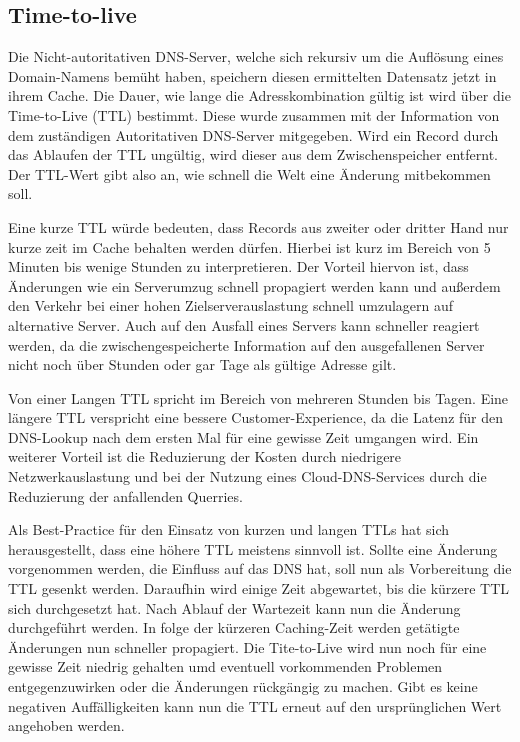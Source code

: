 \subsection{Time-to-live} \label{lab:ttl}
Die Nicht-autoritativen DNS-Server, welche sich rekursiv um die Auflösung eines Domain-Namens bemüht haben, speichern diesen ermittelten Datensatz jetzt in ihrem Cache. Die Dauer, wie lange die Adresskombination gültig ist wird über die Time-to-Live (TTL) bestimmt. Diese wurde zusammen mit der Information von dem zuständigen Autoritativen DNS-Server mitgegeben. Wird ein Record durch das Ablaufen der TTL ungültig, wird dieser aus dem Zwischenspeicher entfernt. Der TTL-Wert gibt also an, wie schnell die Welt eine Änderung mitbekommen soll. 

Eine kurze TTL würde bedeuten, dass Records aus zweiter oder dritter Hand nur kurze zeit im Cache behalten werden dürfen. Hierbei ist kurz im Bereich von 5 Minuten bis wenige Stunden zu interpretieren. Der Vorteil hiervon ist, dass Änderungen wie ein Serverumzug schnell propagiert werden kann und außerdem den Verkehr bei einer hohen Zielserverauslastung schnell umzulagern auf alternative Server. Auch auf den Ausfall eines Servers kann schneller reagiert werden, da die zwischengespeicherte Information auf den ausgefallenen Server nicht noch über Stunden oder gar Tage als gültige Adresse gilt.

Von einer Langen TTL spricht im Bereich von mehreren Stunden bis Tagen. Eine längere TTL verspricht eine bessere Customer-Experience, da die Latenz für den DNS-Lookup nach dem ersten Mal für eine gewisse Zeit umgangen wird. Ein weiterer Vorteil ist die Reduzierung der Kosten durch niedrigere Netzwerkauslastung und bei der Nutzung eines Cloud-DNS-Services durch die Reduzierung der anfallenden Querries.

Als Best-Practice für den Einsatz von kurzen und langen TTLs hat sich herausgestellt, dass eine höhere TTL meistens sinnvoll ist. Sollte eine Änderung vorgenommen werden, die Einfluss auf das DNS hat, soll nun als Vorbereitung die TTL gesenkt werden. Daraufhin wird einige Zeit abgewartet, bis die kürzere TTL sich durchgesetzt hat. Nach Ablauf der Wartezeit kann nun die Änderung durchgeführt werden. In folge der kürzeren Caching-Zeit werden getätigte Änderungen nun schneller propagiert. Die Tite-to-Live wird nun noch für eine gewisse Zeit niedrig gehalten umd eventuell vorkommenden Problemen entgegenzuwirken oder die Änderungen rückgängig zu machen. Gibt es keine negativen Auffälligkeiten kann nun die TTL erneut auf den ursprünglichen Wert angehoben werden.

